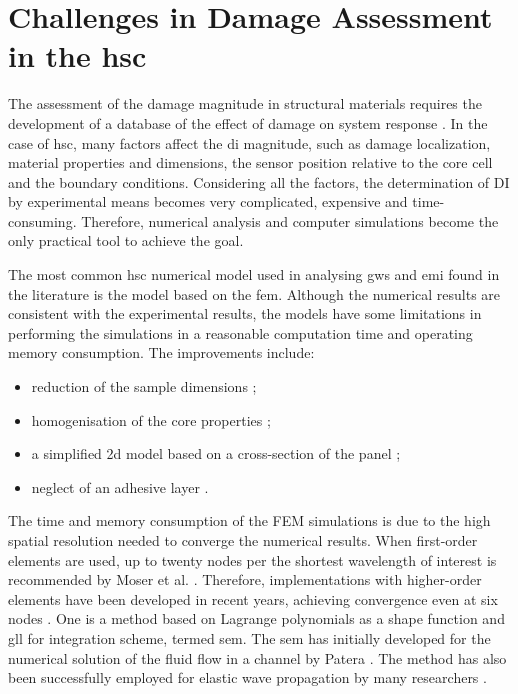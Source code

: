 \section{Challenges in Damage Assessment in the \ac{hsc}}
\label{sec:challenges}

The assessment of the damage magnitude in structural materials requires the development of a database of the effect of damage on system response \cite{worden2007fundamental}.
In the case of \ac{hsc}, many factors affect the \ac{di} magnitude, such as damage localization, material properties and dimensions, the sensor position relative to the core cell and the boundary conditions.
Considering all the factors, the determination of DI by experimental means becomes very complicated, expensive and time-consuming.
Therefore, numerical analysis and computer simulations become the only practical tool to achieve the goal.

The most common \ac{hsc} numerical model used in analysing \acp{gw} and \ac{emi} found in the literature is the model based on the \ac{fem}.
Although the numerical results are consistent with the experimental results, the models have some limitations in performing the simulations in a reasonable computation time and operating memory consumption.
The improvements include:
\begin{itemize}
\item reduction of the sample dimensions \cite{hosseini2013numerical, tian2015wavenumber};
\item homogenisation of the core properties \cite{catapano2014multi, zhou2020debonding};
\item a simplified \ac{2d} model based on a cross-section of the panel \cite{li2019detection};
\item neglect of an adhesive layer \cite{mustapha2013non}.
\end{itemize}
The time and memory consumption of the FEM simulations is due to the high spatial resolution needed to converge the numerical results.
When first-order elements are used, up to twenty nodes per the shortest wavelength of interest is recommended by Moser et al. \cite{moser1999modeling}.
Therefore, implementations with higher-order elements have been developed in recent years, achieving convergence even at six nodes \cite{willberg2012comparison}.
One is a method based on Lagrange polynomials as a shape function and \ac{gll} for integration scheme, termed \ac{sem}.
The \ac{sem} has initially developed for the numerical solution of the fluid flow in a channel by Patera \cite{patera1984spectral}. The method has also been successfully employed for elastic wave propagation by many researchers \cite{seriani1994spectral, kudela2007wave, ostachowicz2011guided, rucka2010experimental, schulte2011simulation, lonkar2014modeling, rekatsinas2017cubic, yu2020time, li2021hybrid}.

